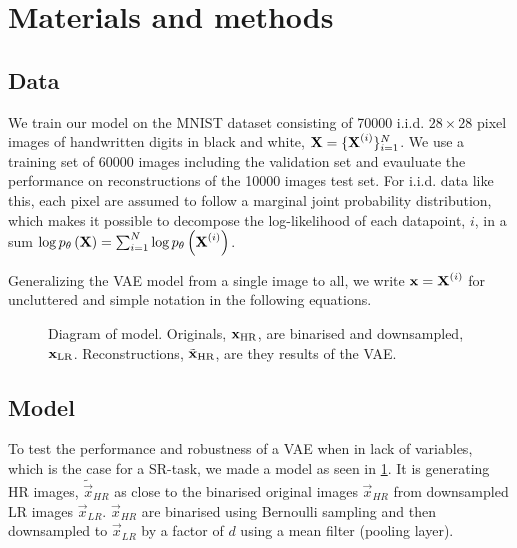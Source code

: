\section{Materials and methods}
\label{sec:method}

\subsection{Data}
\label{sub:data}
We train our model on the MNIST dataset \cite{MNIST} consisting of 70000 i.i.d. $28 \times 28$ pixel images of handwritten digits in black and white, $\bm{\mathrm{X}} = \{\bm{\mathrm{X}}^{(i)}\}^N_{i=1}$. We use a training set of 60000 images including the validation set and evauluate the performance on reconstructions of the 10000 images test set. 
For i.i.d. data like this, each pixel are assumed to follow a marginal joint probability distribution, which makes it possible to decompose the log-likelihood of each datapoint, $i$, in a sum $\log p_{\theta}\left(\bm{\mathrm{X}}\right) = \sum^N_{i=1} \log p_{\theta}\left(\bm{\mathrm{X}}^{(i)}\right)$. 


Generalizing the VAE model from a single image to all, we write $\bm{\mathrm{x}} = \bm{\mathrm{X}}^{(i)}$ for uncluttered and simple notation in the following equations.

\begin{figure*}
	\centering
	
	\caption{Diagram of model. Originals, $\bm{\mathrm{x}}_{\text{HR}}$, are binarised and downsampled, $\bm{\mathrm{x}}_{\text{LR}}$. Reconstructions, $\tilde{\bm{\mathrm{x}}}_{\text{HR}}$, are they results of the VAE.}
	\label{fig:diagram}
\end{figure*}


\subsection{Model}
\label{sub:the_model}

To test the performance and robustness of a VAE when in lack of variables, which is the case for a SR-task, we made a model as seen in \ref{fig:diagram}. It is generating HR images, $\tilde{\vec{x}}_{HR}$ as close to the binarised original images $\vec{x}_{HR}$ from downsampled LR images $\vec{x}_{LR}$. $\vec{x}_{HR}$ are binarised using Bernoulli sampling and then downsampled to $\vec{x}_{LR}$ by a factor of $d$ using a mean filter (pooling layer).

